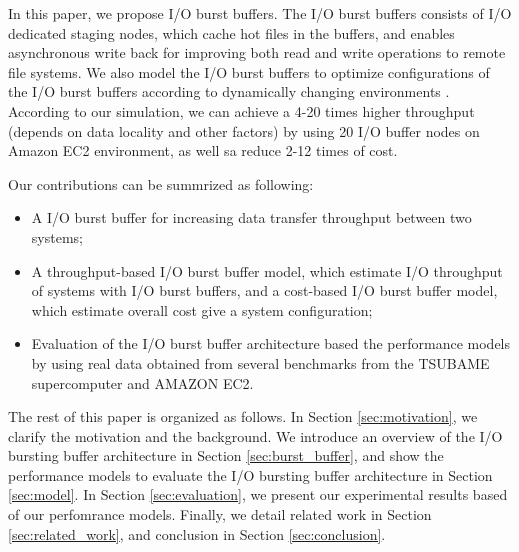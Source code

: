 In this paper, we propose I/O burst buffers. The I/O burst buffers consists of I/O dedicated staging nodes, which cache hot files in the buffers, and enables asynchronous write back for improving both read and write operations to remote file systems.
We also model the I/O burst buffers to optimize  configurations of the I/O burst buffers according to dynamically changing environments
.
According to our simulation, we can achieve a 4-20 times higher throughput (depends on data locality and other factors) by using 20 I/O buffer nodes on Amazon EC2 environment, as well sa reduce 2-12 times of cost.


Our contributions can be summrized as following:
\begin{itemize}
	\item A I/O burst buffer for increasing data transfer throughput between two systems;
	\item A throughput-based I/O burst buffer model, which estimate I/O throughput of systems with I/O burst buffers, and a cost-based I/O burst buffer model, which estimate overall cost give a system configuration;
        \item Evaluation of the I/O burst buffer architecture based the performance models by using real data obtained from several benchmarks from the TSUBAME supercomputer and AMAZON EC2.
\end{itemize}
The rest of this paper is organized as follows. 
In Section \ref{sec:motivation}, we clarify the motivation and the background.
We introduce an overview of the I/O bursting buffer architecture in Section \ref{sec:burst_buffer}, 
and show the performance models to evaluate the I/O bursting buffer architecture in Section \ref{sec:model}. 
In Section \ref{sec:evaluation}, we present our experimental results based of our perfomrance models. %
Finally, we detail related work in Section \ref{sec:related_work}, and conclusion in Section \ref{sec:conclusion}.
